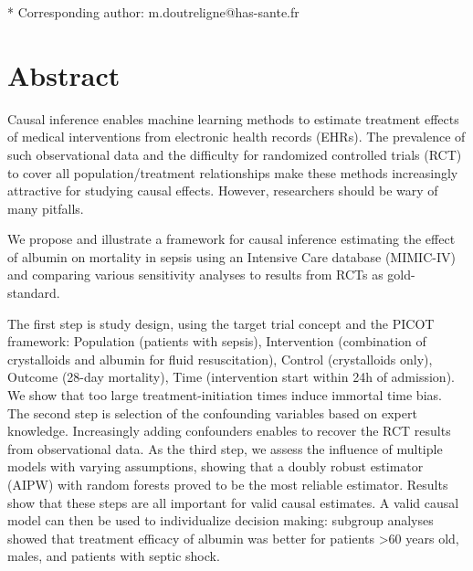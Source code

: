 \documentclass[10pt,letterpaper]{article}
\begin{document}
\begin{flushleft}




  * Corresponding author: m.doutreligne@has-sante.fr


\end{flushleft}
\section*{Abstract}

Causal inference enables machine learning methods to estimate treatment effects
of medical interventions from electronic health records (EHRs). The prevalence
of such observational data and the difficulty for randomized controlled trials (RCT) to cover all
population/treatment relationships make these methods increasingly attractive
for studying causal effects. However, researchers should be wary of many
pitfalls.

We propose and illustrate a framework for causal inference estimating the
effect of albumin on mortality in sepsis using an Intensive Care database
(MIMIC-IV) and comparing various sensitivity analyses to results from RCTs as gold-standard.

The first step is study design, using the target trial concept and the PICOT
framework: Population (patients with sepsis), Intervention (combination of
crystalloids and albumin for fluid resuscitation), Control (crystalloids only),
Outcome (28-day mortality), Time (intervention start within 24h of admission).
We show that too large treatment-initiation times induce immortal time bias.
The second step is selection of the confounding variables based on expert
knowledge. Increasingly adding confounders enables to recover the RCT results
from observational data. As the third step, we assess the influence
of multiple models with varying assumptions, showing that a doubly robust estimator (AIPW)
with random forests proved to be the most reliable estimator. Results show that
these steps are all important for valid causal estimates. A valid causal model
can then be used to individualize decision making: subgroup analyses showed that
treatment efficacy of albumin was better for patients >60 years old, males, and
patients with septic shock.
\end{document}

